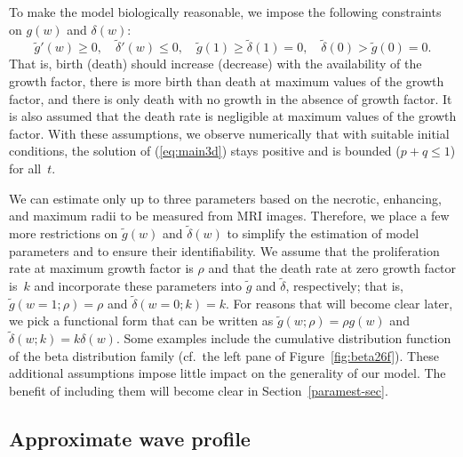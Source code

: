 \documentclass{aims}
\numberwithin{equation}{section}
\begin{document}
To make the model biologically reasonable, we impose the following constraints on $g(w)$ and $\delta(w)$:
\begin{equation}
\tilde{g}'(w)\ge0,\quad
\tilde{\delta}'(w)\le0,\quad
\tilde{g}(1)\ge\tilde{\delta}(1)=0,\quad
\tilde{\delta}(0)>\tilde{g}(0)=0.
\label{eq:1assume}
\end{equation}
That is, birth (death) should increase (decrease) with the availability of
the growth factor, there is more birth than death at maximum values of
the growth factor, and there is only death with no growth in the 
absence of growth factor. 
It is also assumed that the death rate is negligible at maximum values of
the growth factor.  With these assumptions, we observe numerically that with suitable initial conditions, the solution of (\ref{eq:main3d}) stays positive and is bounded ($p+q\le 1$) for all~$t$. 

We can estimate only up to three parameters based on the necrotic,
enhancing, and maximum radii to be measured
from MRI images.  Therefore, we place a few more
restrictions on $\tilde{g}(w)$ and $\tilde{\delta}(w)$ to simplify
the estimation of model parameters and to ensure their identifiability.
We assume that the proliferation rate at maximum growth factor is $\rho$
and that the death rate at zero growth factor
is~$k$ and incorporate these parameters into $\tilde{g}$ and
$\tilde{\delta}$, respectively; that is,
$\tilde{g}(w=1;\rho)=\rho$ and $\tilde{\delta}(w=0;k)=k$.
For reasons that will become clear later, we pick a functional form
that can be written as $\tilde{g}(w;\rho)=\rho g(w)$ and 
$\tilde{\delta}(w;k)=k\delta(w)$.
Some examples include the cumulative distribution function of the beta 
distribution family (cf.\ the left pane of Figure~\ref{fig:beta26f}).
These additional assumptions impose little impact on the generality 
of our model. The benefit of including them will become
clear in Section~\ref{paramest-sec}.

\subsection{Approximate wave profile}
\end{document}
